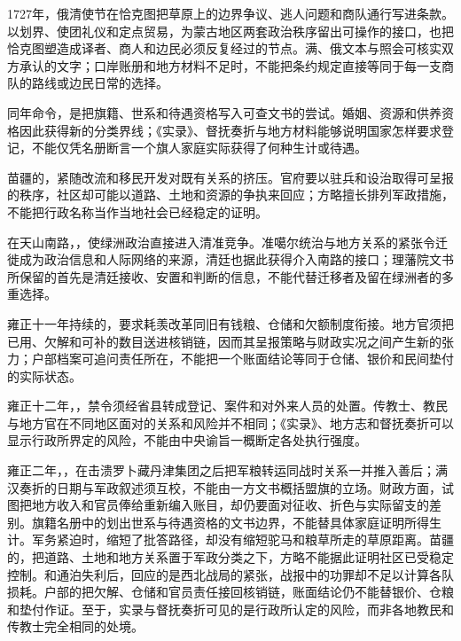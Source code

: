 1727年，俄清使节在恰克图把草原上的边界争议、逃人问题和商队通行写进条款。以划界、使团礼仪和定点贸易，为蒙古地区两套政治秩序留出可操作的接口，也把恰克图塑造成译者、商人和边民必须反复经过的节点。满、俄文本与照会可核实双方承认的文字；口岸账册和地方材料不足时，不能把条约规定直接等同于每一支商队的路线或边民日常的选择。

同年命令，是把旗籍、世系和待遇资格写入可查文书的尝试。婚姻、资源和供养资格因此获得新的分类界线；《实录》、督抚奏折与地方材料能够说明国家怎样要求登记，不能仅凭名册断言一个旗人家庭实际获得了何种生计或待遇。

苗疆的，紧随改流和移民开发对既有关系的挤压。官府要以驻兵和设治取得可呈报的秩序，社区却可能以道路、土地和资源的争执来回应；方略擅长排列军政措施，不能把行政名称当作当地社会已经稳定的证明。

在天山南路，，使绿洲政治直接进入清准竞争。准噶尔统治与地方关系的紧张令迁徙成为政治信息和人际网络的来源，清廷也据此获得介入南路的接口；理藩院文书所保留的首先是清廷接收、安置和判断的信息，不能代替迁移者及留在绿洲者的多重选择。

雍正十一年持续的，要求耗羡改革同旧有钱粮、仓储和欠额制度衔接。地方官须把已用、欠解和可补的数目送进核销链，因而其呈报策略与财政实况之间产生新的张力；户部档案可追问责任所在，不能把一个账面结论等同于仓储、银价和民间垫付的实际状态。

雍正十二年，，禁令须经省县转成登记、案件和对外来人员的处置。传教士、教民与地方官在不同地区面对的关系和风险并不相同；《实录》、地方志和督抚奏折可以显示行政所界定的风险，不能由中央谕旨一概断定各处执行强度。

雍正二年，，在击溃罗卜藏丹津集团之后把军粮转运同战时关系一并推入善后；满汉奏折的日期与军政叙述须互校，不能由一方文书概括盟旗的立场。财政方面，试图把地方收入和官员俸给重新编入账目，却仍要面对征收、折色与实际留支的差别。旗籍名册中的划出世系与待遇资格的文书边界，不能替具体家庭证明所得生计。军务紧迫时，缩短了批答路径，却没有缩短驼马和粮草所走的草原距离。苗疆的，把道路、土地和地方关系置于军政分类之下，方略不能据此证明社区已受稳定控制。和通泊失利后，回应的是西北战局的紧张，战报中的功罪却不足以计算各队损耗。户部的把欠解、仓储和官员责任接回核销链，账面结论仍不能替银价、仓粮和垫付作证。至于，实录与督抚奏折可见的是行政所认定的风险，而非各地教民和传教士完全相同的处境。

